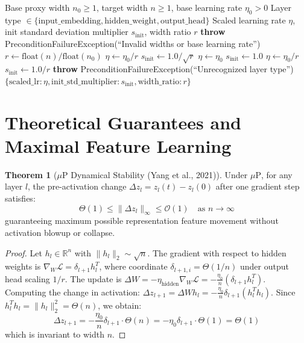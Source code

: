 \documentclass[11pt,a4paper]{article}
\theoremstyle{definition}
\newtheorem{theorem}{Theorem}[section]
\begin{document}
\begin{algorithm}[H]
\caption{Maximal Update Parametrization ($\mu\text{P}$) Scaling Computation}
\begin{algorithmic}[1]
\Require Base proxy width $n_0 \ge 1$, target width $n \ge 1$, base learning rate $\eta_0 > 0$
\Require Layer type $\in \{\text{input\_embedding}, \text{hidden\_weight}, \text{output\_head}\}$
\Ensure Scaled learning rate $\eta$, init standard deviation multiplier $s_{\text{init}}$, width ratio $r$
    \State \textbf{throw} PreconditionFailureException(``Invalid widths or base learning rate'')
\EndIf
\State $r \gets \text{float}(n) / \text{float}(n_0)$
    \State $\eta \gets \eta_0 / r$
    \State $s_{\text{init}} \gets 1.0 / \sqrt{r}$
    \State $\eta \gets \eta_0$
    \State $s_{\text{init}} \gets 1.0$
    \State $\eta \gets \eta_0 / r$
    \State $s_{\text{init}} \gets 1.0 / r$
\Else
    \State \textbf{throw} PreconditionFailureException(``Unrecognized layer type'')
\EndIf
\State \Return $\{\text{scaled\_lr}: \eta, \text{init\_std\_multiplier}: s_{\text{init}}, \text{width\_ratio}: r\}$
\end{algorithmic}
\end{algorithm}

\section{Theoretical Guarantees and Maximal Feature Learning}

\begin{theorem}[$\mu\text{P}$ Dynamical Stability (Yang et al., 2021)]
Under $\mu\text{P}$, for any layer $l$, the pre-activation change $\Delta z_l = z_l(t) - z_l(0)$ after one gradient step satisfies:
\begin{equation}
\Theta(1) \le \|\Delta z_l\|_\infty \le \mathcal{O}(1) \quad \text{as } n \to \infty
\end{equation}
guaranteeing maximum possible representation feature movement without activation blowup or collapse.
\end{theorem}

\begin{proof}
Let $h_l \in \mathbb{R}^n$ with $\|h_l\|_2 \sim \sqrt{n}$. The gradient with respect to hidden weights is $\nabla_W \mathcal{L} = \delta_{l+1} h_l^T$, where coordinate $\delta_{l+1, i} = \Theta(1/n)$ under output head scaling $1/r$. The update is $\Delta W = -\eta_{\text{hidden}} \nabla_W \mathcal{L} = -\frac{\eta_0}{n} (\delta_{l+1} h_l^T)$.
Computing the change in activation: $\Delta z_{l+1} = \Delta W h_l = -\frac{\eta_0}{n} \delta_{l+1} (h_l^T h_l)$. Since $h_l^T h_l = \|h_l\|_2^2 = \Theta(n)$, we obtain:
\begin{equation}
\Delta z_{l+1} = -\frac{\eta_0}{n} \delta_{l+1} \cdot \Theta(n) = -\eta_0 \delta_{l+1} \cdot \Theta(1) = \Theta(1)
\end{equation}
which is invariant to width $n$.
\end{proof}
\end{document}
